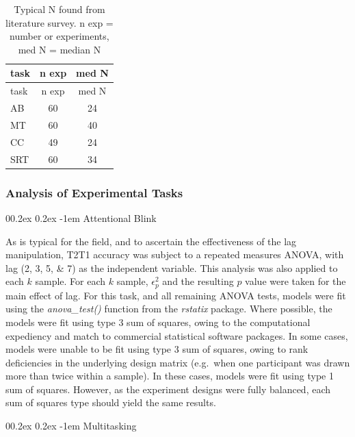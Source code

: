 \documentclass[
  man]{apa6}
\makeatletter
\let\oldparagraph\paragraph
\renewcommand{\paragraph}[1]{\oldparagraph{#1}\mbox{}}
\renewcommand{\paragraph}{\@startsection{paragraph}{4}{\parindent}%
  {0\baselineskip \@plus 0.2ex \@minus 0.2ex}%
  {-1em}%
  {\normalfont\normalsize\bfseries\itshape\typesectitle}}
\makeatother
\begin{document}
\begin{longtable}[]{@{}lcc@{}}
\caption{\label{tab:survey}Typical N found from literature survey. n exp = number or experiments, med N = median N}\tabularnewline
\toprule()
task & n exp & med N \\
\midrule()
\endfirsthead
\toprule()
task & n exp & med N \\
\midrule()
\endhead
AB & 60 & 24 \\
MT & 60 & 40 \\
CC & 49 & 24 \\
SRT & 60 & 34 \\
\bottomrule()
\end{longtable}

\hypertarget{analysis-of-experimental-tasks}{%
\subsubsection{Analysis of Experimental Tasks}\label{analysis-of-experimental-tasks}}

\hypertarget{attentional-blink}{%
\paragraph{Attentional Blink}\label{attentional-blink}}

As is typical for the field, and to ascertain the effectiveness of the lag manipulation, T2\textbar T1 accuracy was subject to a repeated measures ANOVA, with lag (2, 3, 5, \& 7) as the independent variable. This analysis was also applied to each \(k\) sample. For each \(k\) sample, \(\epsilon_{p}^2\) and the resulting \(p\) value were taken for the main effect of lag. For this task, and all remaining ANOVA tests, models were fit using the \emph{anova\_test()} function from the \emph{rstatix} package. Where possible, the models were fit using type 3 sum of squares, owing to the computational expediency and match to commercial statistical software packages. In some cases, models were unable to be fit using type 3 sum of squares, owing to rank deficiencies in the underlying design matrix (e.g.~when one participant was drawn more than twice within a sample). In these cases, models were fit using type 1 sum of squares. However, as the experiment designs were fully balanced, each sum of squares type should yield the same results.

\hypertarget{multitasking}{%
\paragraph{Multitasking}\label{multitasking}}
\end{document}
